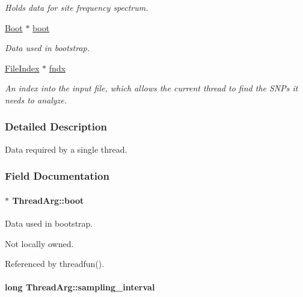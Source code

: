 \begin{DoxyCompactItemize}
\begin{DoxyCompactList}\small\item\em \-Holds data for site frequency spectrum. \end{DoxyCompactList}\item 
\hyperlink{struct_boot}{\-Boot} $\ast$ \hyperlink{struct_thread_arg_ae5c418037c3ccc0cf13910f10c0bbdbf}{boot}
\begin{DoxyCompactList}\small\item\em \-Data used in bootstrap. \end{DoxyCompactList}\item 
\hypertarget{struct_thread_arg_ad652e2df901567d530d9f4876e5c6568}{\hyperlink{struct_file_index}{\-File\-Index} $\ast$ \hyperlink{struct_thread_arg_ad652e2df901567d530d9f4876e5c6568}{fndx}}\label{struct_thread_arg_ad652e2df901567d530d9f4876e5c6568}

\begin{DoxyCompactList}\small\item\em \-An index into the input file, which allows the current thread to find the \-S\-N\-Ps it needs to analyze. \end{DoxyCompactList}\end{DoxyCompactItemize}


\subsubsection{\-Detailed \-Description}
\-Data required by a single thread. 

\subsubsection{\-Field \-Documentation}
\hypertarget{struct_thread_arg_ae5c418037c3ccc0cf13910f10c0bbdbf}{
\paragraph[{boot}]{ $\ast$ {\bf \-Thread\-Arg\-::boot}}}\label{struct_thread_arg_ae5c418037c3ccc0cf13910f10c0bbdbf}


\-Data used in bootstrap. 

\-Not locally owned. 

\-Referenced by threadfun().

\hypertarget{struct_thread_arg_ac82e3148f3f1efd2ad66f235afd1f5e5}{
\paragraph[{sampling\-\_\-interval}]{\setlength{\rightskip}{0pt plus 5cm}long {\bf \-Thread\-Arg\-::sampling\-\_\-interval}}}\label{struct_thread_arg_ac82e3148f3f1efd2ad66f235afd1f5e5}


